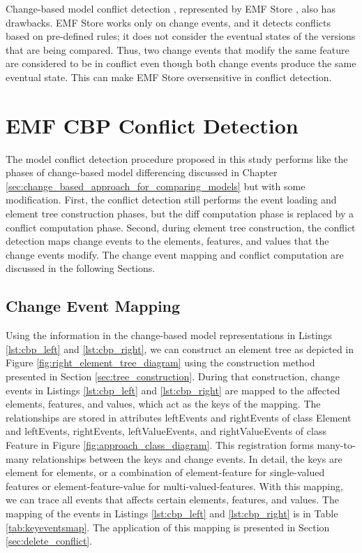 Change-based model conflict detection \cite{koegel2010operation}, represented by EMF Store \cite{emfstore2019what}, also has drawbacks. EMF Store works only on change events, and it detects conflicts based on pre-defined rules; it does not consider the eventual states of the versions that are being compared. Thus, two change events that modify the same feature are considered to be in conflict even though both change events produce the same eventual state. This can make EMF Store oversensitive in conflict detection.

\section{EMF CBP Conflict Detection}
\label{sec:emf_cbp_conflict_detection}

The model conflict detection procedure proposed in this study performs like the phases of change-based model differencing discussed in Chapter \ref{sec:change_based_approach_for_comparing_models} but with some modification. First, the conflict detection still performs the event loading and element tree construction phases, but the diff computation phase is replaced by a conflict computation phase. Second, during element tree construction, the conflict detection maps change events to the elements, features, and values that the change events modify. The change event mapping and conflict computation are discussed in the following Sections.

\subsection{Change Event Mapping}
\label{sec:change_event_mapping}
Using the information in the change-based model representations in Listings \ref{lst:cbp_left} and \ref{lst:cbp_right}, we can construct an element tree as depicted in Figure \ref{fig:right_element_tree_diagram} using the construction method presented in Section \ref{sec:tree_construction}. During that construction, change events in Listings \ref{lst:cbp_left} and \ref{lst:cbp_right} are mapped to the affected elements, features, and values, which act as the keys of the mapping. The relationships are stored in attributes \textsf{leftEvents} and \textsf{rightEvents} of class \textsf{Element} and \textsf{leftEvents}, \textsf{rightEvents}, \textsf{leftValueEvents}, and \textsf{rightValueEvents} of class \textsf{Feature} in Figure \ref{fig:approach_class_diagram}. This registration forms many-to-many relationships between the keys and change events. In detail, the keys are \textsf{element} for elements, or a combination of \textsf{element-feature} for single-valued features or \textsf{element-feature-value} for multi-valued-features. With this mapping, we can trace all events that affects certain elements, features, and values. The mapping of the events in Listings \ref{lst:cbp_left} and \ref{lst:cbp_right} is in Table \ref{tab:keyeventsmap}. The application of this mapping is presented in Section \ref{sec:delete_conflict}.


